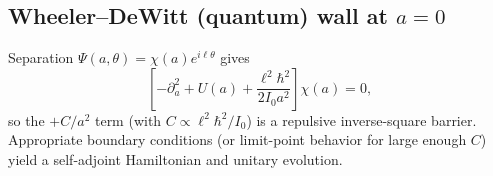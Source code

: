 
\subsection{Wheeler--DeWitt (quantum) wall at \texorpdfstring{$a=0$}{a=0}}\label{sec:wdw}
Separation $\Psi(a,\theta)=\chi(a)e^{i\ell\theta}$ gives
\begin{equation}
 \left[-\partial_a^2 + U(a) + \frac{\ell^2\hbar^2}{2 I_0 a^2}\right]\chi(a)=0,
\end{equation}
so the $+C/a^2$ term (with $C\propto \ell^2\hbar^2/I_0$) is a repulsive inverse-square barrier. Appropriate boundary conditions (or limit-point behavior for large enough $C$) yield a self-adjoint Hamiltonian and unitary evolution.
